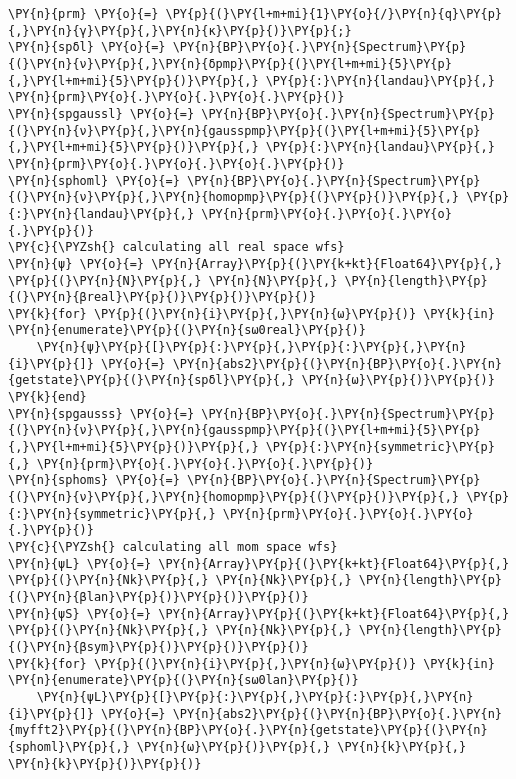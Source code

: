 \begin{Verbatim}[commandchars=\\\{\}]
\PY{n}{prm} \PY{o}{=} \PY{p}{(}\PY{l+m+mi}{1}\PY{o}{/}\PY{n}{q}\PY{p}{,}\PY{n}{γ}\PY{p}{,}\PY{n}{κ}\PY{p}{)}\PY{p}{;}
\PY{n}{spδl} \PY{o}{=} \PY{n}{BP}\PY{o}{.}\PY{n}{Spectrum}\PY{p}{(}\PY{n}{ν}\PY{p}{,}\PY{n}{δpmp}\PY{p}{(}\PY{l+m+mi}{5}\PY{p}{,}\PY{l+m+mi}{5}\PY{p}{)}\PY{p}{,} \PY{p}{:}\PY{n}{landau}\PY{p}{,} \PY{n}{prm}\PY{o}{.}\PY{o}{.}\PY{o}{.}\PY{p}{)}
\PY{n}{spgaussl} \PY{o}{=} \PY{n}{BP}\PY{o}{.}\PY{n}{Spectrum}\PY{p}{(}\PY{n}{ν}\PY{p}{,}\PY{n}{gausspmp}\PY{p}{(}\PY{l+m+mi}{5}\PY{p}{,}\PY{l+m+mi}{5}\PY{p}{)}\PY{p}{,} \PY{p}{:}\PY{n}{landau}\PY{p}{,} \PY{n}{prm}\PY{o}{.}\PY{o}{.}\PY{o}{.}\PY{p}{)}
\PY{n}{sphoml} \PY{o}{=} \PY{n}{BP}\PY{o}{.}\PY{n}{Spectrum}\PY{p}{(}\PY{n}{ν}\PY{p}{,}\PY{n}{homopmp}\PY{p}{(}\PY{p}{)}\PY{p}{,} \PY{p}{:}\PY{n}{landau}\PY{p}{,} \PY{n}{prm}\PY{o}{.}\PY{o}{.}\PY{o}{.}\PY{p}{)}
\PY{c}{\PYZsh{} calculating all real space wfs}
\PY{n}{ψ} \PY{o}{=} \PY{n}{Array}\PY{p}{(}\PY{k+kt}{Float64}\PY{p}{,} \PY{p}{(}\PY{n}{N}\PY{p}{,} \PY{n}{N}\PY{p}{,} \PY{n}{length}\PY{p}{(}\PY{n}{βreal}\PY{p}{)}\PY{p}{)}\PY{p}{)}
\PY{k}{for} \PY{p}{(}\PY{n}{i}\PY{p}{,}\PY{n}{ω}\PY{p}{)} \PY{k}{in} \PY{n}{enumerate}\PY{p}{(}\PY{n}{sω0real}\PY{p}{)}
    \PY{n}{ψ}\PY{p}{[}\PY{p}{:}\PY{p}{,}\PY{p}{:}\PY{p}{,}\PY{n}{i}\PY{p}{]} \PY{o}{=} \PY{n}{abs2}\PY{p}{(}\PY{n}{BP}\PY{o}{.}\PY{n}{getstate}\PY{p}{(}\PY{n}{spδl}\PY{p}{,} \PY{n}{ω}\PY{p}{)}\PY{p}{)}
\PY{k}{end}
\PY{n}{spgausss} \PY{o}{=} \PY{n}{BP}\PY{o}{.}\PY{n}{Spectrum}\PY{p}{(}\PY{n}{ν}\PY{p}{,}\PY{n}{gausspmp}\PY{p}{(}\PY{l+m+mi}{5}\PY{p}{,}\PY{l+m+mi}{5}\PY{p}{)}\PY{p}{,} \PY{p}{:}\PY{n}{symmetric}\PY{p}{,} \PY{n}{prm}\PY{o}{.}\PY{o}{.}\PY{o}{.}\PY{p}{)}
\PY{n}{sphoms} \PY{o}{=} \PY{n}{BP}\PY{o}{.}\PY{n}{Spectrum}\PY{p}{(}\PY{n}{ν}\PY{p}{,}\PY{n}{homopmp}\PY{p}{(}\PY{p}{)}\PY{p}{,} \PY{p}{:}\PY{n}{symmetric}\PY{p}{,} \PY{n}{prm}\PY{o}{.}\PY{o}{.}\PY{o}{.}\PY{p}{)}
\PY{c}{\PYZsh{} calculating all mom space wfs}
\PY{n}{ψL} \PY{o}{=} \PY{n}{Array}\PY{p}{(}\PY{k+kt}{Float64}\PY{p}{,} \PY{p}{(}\PY{n}{Nk}\PY{p}{,} \PY{n}{Nk}\PY{p}{,} \PY{n}{length}\PY{p}{(}\PY{n}{βlan}\PY{p}{)}\PY{p}{)}\PY{p}{)}
\PY{n}{ψS} \PY{o}{=} \PY{n}{Array}\PY{p}{(}\PY{k+kt}{Float64}\PY{p}{,} \PY{p}{(}\PY{n}{Nk}\PY{p}{,} \PY{n}{Nk}\PY{p}{,} \PY{n}{length}\PY{p}{(}\PY{n}{βsym}\PY{p}{)}\PY{p}{)}\PY{p}{)}
\PY{k}{for} \PY{p}{(}\PY{n}{i}\PY{p}{,}\PY{n}{ω}\PY{p}{)} \PY{k}{in} \PY{n}{enumerate}\PY{p}{(}\PY{n}{sω0lan}\PY{p}{)}
    \PY{n}{ψL}\PY{p}{[}\PY{p}{:}\PY{p}{,}\PY{p}{:}\PY{p}{,}\PY{n}{i}\PY{p}{]} \PY{o}{=} \PY{n}{abs2}\PY{p}{(}\PY{n}{BP}\PY{o}{.}\PY{n}{myfft2}\PY{p}{(}\PY{n}{BP}\PY{o}{.}\PY{n}{getstate}\PY{p}{(}\PY{n}{sphoml}\PY{p}{,} \PY{n}{ω}\PY{p}{)}\PY{p}{,} \PY{n}{k}\PY{p}{,} \PY{n}{k}\PY{p}{)}\PY{p}{)}

\end{Verbatim}
